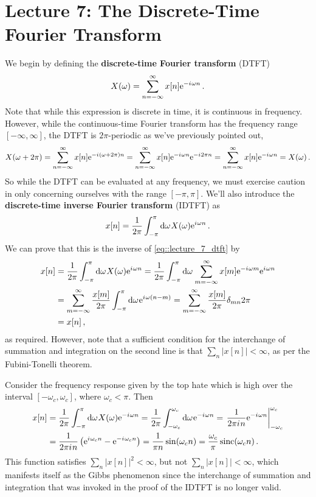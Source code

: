 \section{Lecture 7: The Discrete-Time Fourier Transform}

We begin by defining the \textbf{discrete-time Fourier transform} (DTFT)
%
\begin{equation}\label{eq::lecture_7_dtft}
  X(\omega) = \sum_{n=-\infty}^\infty x[n]\mathrm{e}^{-{i\mkern1mu}\omega n} \,.
\end{equation}
%
Note that while this expression is discrete in time, it is continuous
in frequency. However, while the continuous-time Fourier transform
has the frequency range $[-\infty,\infty]$, the DTFT is $2\pi$-periodic
as we've previously pointed out,
%
\begin{displaymath}
  X(\omega + 2\pi) = \sum_{n=-\infty}^\infty x[n]\mathrm{e}^{-{i\mkern1mu}(\omega+2\pi)n}
  = \sum_{n=-\infty}^\infty x[n]\mathrm{e}^{-{i\mkern1mu}\omega n}\mathrm{e}^{-{i\mkern1mu} 2\pi n}
  = \sum_{n=-\infty}^\infty x[n]\mathrm{e}^{-{i\mkern1mu}\omega n} = X(\omega) \,.
\end{displaymath}
%
So while the DTFT can be evaluated at any frequency, we must exercise
caution in only concerning ourselves with the range $[-\pi,\pi]$.
We'll also introduce the \textbf{discrete-time inverse Fourier transform}
(IDTFT) as
%
\begin{equation}
  x[n] = \frac{1}{2\pi}\int_{-\pi}^\pi\mathrm{d}\omega\mkern1mu X(\omega)\mathrm{e}^{{i\mkern1mu}\omega n} \,.
\end{equation}
%
We can prove that this is the inverse of \eqref{eq::lecture_7_dtft} by
%
\begin{align*}
  x[n] &= \frac{1}{2\pi}\int_{-\pi}^\pi\mathrm{d}\omega\mkern1mu X(\omega)\mathrm{e}^{{i\mkern1mu}\omega n}
  = \frac{1}{2\pi}\int_{-\pi}^\pi\mathrm{d}\omega\mkern1mu \sum_{m=-\infty}^\infty x[m]\mathrm{e}^{-{i\mkern1mu}\omega m}\mathrm{e}^{{i\mkern1mu}\omega n} \\
  &= \sum_{m=-\infty}^\infty \frac{x[m]}{2\pi}\int_{-\pi}^\pi\mathrm{d}\omega\mkern1mu\mathrm{e}^{{i\mkern1mu}\omega(n-m)}
  = \sum_{m=-\infty}^\infty \frac{x[m]}{2\pi}\delta_{mn}2\pi \\
  &= x[n] \,,
\end{align*}
%
as required. However, note that a sufficient condition for the interchange of
summation and integration on the second line is that $\sum_n|x[n]| < \infty$,
as per the Fubini-Tonelli theorem.
%
\begin{exmp}
  Consider the frequency response given by the top hate which is high over the
  interval $[-\omega_c,\omega_c]$, where $\omega_c < \pi$. Then
  \begin{align*}
    x[n] &= \frac{1}{2\pi}\int_{-\pi}^\pi \mathrm{d}\omega\mkern1muX(\omega)\mathrm{e}^{-{i\mkern1mu}\omega n}
    = \frac{1}{2\pi}\int_{-\omega_c}^{\omega_c} \mathrm{d}\omega\mkern1mu\mathrm{e}^{-{i\mkern1mu}\omega n}
    = \left. \frac{1}{2\pi{i\mkern1mu} n}\mathrm{e}^{-{i\mkern1mu}\omega n}\right|_{-\omega_c}^{\omega_c} \\
    &= \frac{1}{2\pi{i\mkern1mu} n} \left(\mathrm{e}^{{i\mkern1mu}\omega_c n} - \mathrm{e}^{-{i\mkern1mu}\omega_c n}\right)
    = \frac{1}{\pi n}\sin(\omega_c n) = \frac{\omega_c}{\pi}\operatorname{sinc}(\omega_c n) \,.
  \end{align*}
  This function satisfies $\sum_n|x[n]|^2 < \infty$, but not $\sum_n|x[n]| < \infty$,
  which manifests itself as the Gibbs phenomenon since the interchange of summation
  and integration that was invoked in the proof of the IDTFT is no longer valid.
\end{exmp}
